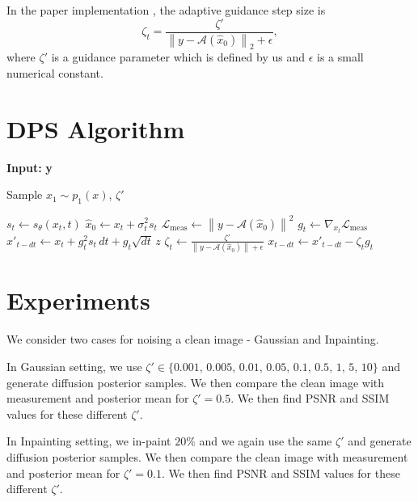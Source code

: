 \documentclass[12pt,a4paper]{report}
\begin{document}
\noindent
In the paper implementation \cite{chung2024diffusionposteriorsamplinggeneral}, the adaptive guidance step size is
\begin{equation}
    \zeta_t
    =
    \frac{\zeta'}
    {
    \left\|
    y-\mathcal{A}(\hat{x}_0)
    \right\|_2+\epsilon
    },
\end{equation}
\noindent
where $\zeta'$ is a guidance parameter which is defined by us and $\epsilon$ is a small numerical constant.

\section{DPS Algorithm}
\begin{algorithm}[H]
\caption{DPS-Gaussian VE-SDE}
\label{alg:measurement_guided_sampling}
\textbf{Input:} \textbf{y}
\begin{algorithmic}[1]

\STATE Sample $x_1 \sim p_1(x)$, $\zeta'$

    \STATE $s_t \gets s_{\theta}(x_t,t)$
    \STATE $\hat{x}_0 \gets x_t + \sigma_t^2 s_t$
    \STATE
    $\mathcal{L}_{\mathrm{meas}}
    \gets
    \left\|
    y-\mathcal{A}(\hat{x}_0)
    \right\|^2$
    \STATE
    $g_t
    \gets
    \nabla_{x_t}\mathcal{L}_{\mathrm{meas}}$
    \STATE
    $x'_{t-dt}
    \gets
    x_t + g_t^2 s_t\,dt
    + g_t\sqrt{dt}\,z$
   \STATE
    $\displaystyle
    \zeta_t
    \gets
    \frac{\zeta'}
    {\left\|y-\mathcal{A}(\hat{x}_0)\right\|+\epsilon}$
    \STATE
    $x_{t-dt}
    \gets
    x'_{t-dt}-\zeta_t g_t$
\ENDFOR

\end{algorithmic}
\end{algorithm}

\section{Experiments}
We consider two cases for noising a clean image - Gaussian and Inpainting.

\vspace{0.3cm}
\noindent
In Gaussian setting, we use $\zeta' \in \{0.001, \, 0.005, \,0.01, \,0.05, \,0.1, \,0.5, \,1,\, 5, \,10\}$ and generate diffusion posterior samples. We then compare the clean image with measurement and posterior mean for $\zeta' = 0.5$. We then find PSNR and SSIM values for these different $\zeta'$.

\vspace{0.3cm}
\noindent
In Inpainting setting, we in-paint $20\%$ and we again use the same $\zeta'$ and generate diffusion posterior samples. We then compare the clean image with measurement and posterior mean for $\zeta' = 0.1$. We then find PSNR and SSIM values for these different $\zeta'$.
\end{document}
